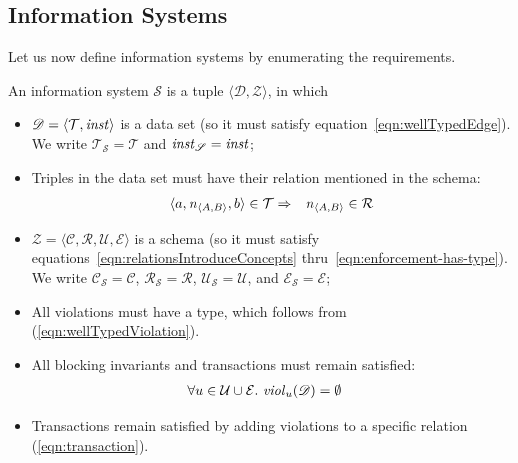 \documentclass[runningheads]{llncs}
\newcommand{\id}[1]{\text{\it #1\/}}
\newcommand{\instance}{\mathbin{\id{inst}}}
\newcommand{\viol}[2]{\violC{#1}(#2)}
\newcommand{\violC}[1]{\id{viol}_{#1}}
\newcommand{\declare}[3]{\id{#1}_{\pair{#2}{#3}}}
\newcommand{\pair}[2]{\langle{#1},{#2}\rangle}
\newcommand{\triple}[3]{\langle{#1},{#2},{#3}\rangle}
\newcommand{\quadruple}[4]{\langle{#1},{#2},{#3},{#4}\rangle}
\newcommand{\concepts}{\mathcal{C}}
\newcommand{\rels}{\mathcal{R}}   %
\newcommand{\triples}{\mathcal{T}}
\newcommand{\transactions}{\mathcal{E}}
\newcommand{\rules}{\mathcal{U}}
\newcommand{\dataset}{\mathscr{D}}
\newcommand{\schema}{\mathscr{Z}}
\newcommand{\infsys}{\mathscr{S}}
\def\define#1{\label{dfn:#1}{\em #1}\index{#1}}
\begin{document}
\subsection{Information Systems}
\label{sct:Information Systems}
   Let us now define information systems by enumerating the requirements.
\begin{definition}
\label{def:information system}
\item An information system $\infsys$ is a tuple $\pair{\dataset}{\schema}$, in which
\begin{itemize}
\item $\dataset=\pair{\triples}{\instance}$ is a data set (so it must satisfy equation~\ref{eqn:wellTypedEdge}). We write $\triples_\infsys = \triples$ and $\instance_\infsys = \instance$;
\item Triples in the data set must have their relation mentioned in the schema:
   \begin{eqnarray}
      \triple{a}{\declare{n}{A}{B}}{b}\in\triples&\Rightarrow&\declare{n}{A}{B}\in\rels
   \label{eqn:define R}
   \end{eqnarray}
\item $\schema=\quadruple{\concepts}{\rels}{\rules}{\transactions}$ is a schema (so it must satisfy equations~\ref{eqn:relationsIntroduceConcepts} thru~\ref{eqn:enforcement-has-type}). We write $\concepts_\infsys = \concepts$, $\rels_\infsys = \rels$, $\rules_\infsys=\rules$, and $\transactions_\infsys=\transactions$;
\item All violations must have a type, which follows from  (\ref{eqn:wellTypedViolation}).
\item All blocking invariants and transactions must remain satisfied:
   \begin{align}
      \forall u\in\rules\cup\transactions&.~\viol{u}{\dataset}=\emptyset
   \label{eqn:satisfaction}
   \end{align}
\item Transactions remain satisfied by adding violations to a specific relation (\ref{eqn:transaction}).
\end{itemize}
\end{definition}
\end{document}
